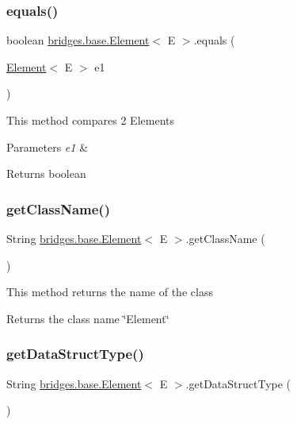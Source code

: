 \subsubsection{\texorpdfstring{equals()}{equals()}}
{\footnotesize\ttfamily boolean \hyperlink{classbridges_1_1base_1_1_element}{bridges.\+base.\+Element}$<$ E $>$.equals (\begin{DoxyParamCaption}\item[{\hyperlink{classbridges_1_1base_1_1_element}{Element}$<$ E $>$}]{e1 }\end{DoxyParamCaption})}

This method compares 2 Elements 
\begin{DoxyParams}{Parameters}
{\em e1} & \\
\hline
\end{DoxyParams}
\begin{DoxyReturn}{Returns}
boolean 
\end{DoxyReturn}
\hypertarget{classbridges_1_1base_1_1_element_aa235244426486921bef319a28616bf8b}{}\label{classbridges_1_1base_1_1_element_aa235244426486921bef319a28616bf8b} 
\subsubsection{\texorpdfstring{get\+Class\+Name()}{getClassName()}}
{\footnotesize\ttfamily String \hyperlink{classbridges_1_1base_1_1_element}{bridges.\+base.\+Element}$<$ E $>$.get\+Class\+Name (\begin{DoxyParamCaption}{ }\end{DoxyParamCaption})}

This method returns the name of the class \begin{DoxyReturn}{Returns}
the class name \char`\"{}\+Element\char`\"{} 
\end{DoxyReturn}
\hypertarget{classbridges_1_1base_1_1_element_a6a1b70fa4b1936d10c6deb433acf8cd9}{}\label{classbridges_1_1base_1_1_element_a6a1b70fa4b1936d10c6deb433acf8cd9} 
\subsubsection{\texorpdfstring{get\+Data\+Struct\+Type()}{getDataStructType()}}
{\footnotesize\ttfamily String \hyperlink{classbridges_1_1base_1_1_element}{bridges.\+base.\+Element}$<$ E $>$.get\+Data\+Struct\+Type (\begin{DoxyParamCaption}{ }\end{DoxyParamCaption})\hspace{0.3cm}{\ttfamily [protected]}}

